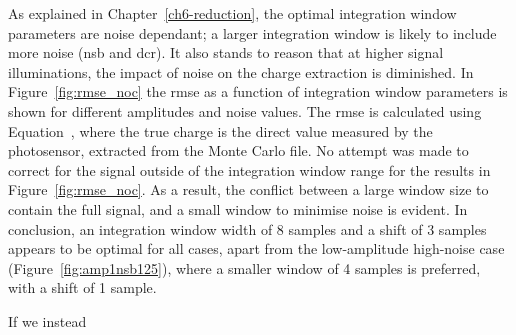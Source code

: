 As explained in Chapter~\ref{ch6-reduction}, the optimal integration window parameters are noise dependant; a larger integration window is likely to include more noise (\gls{nsb} and \gls{dcr}). It also stands to reason that at higher signal illuminations, the impact of noise on the charge extraction is diminished. In Figure~\ref{fig:rmse_noc} the \gls{rmse} as a function of integration window parameters is shown for different amplitudes and noise values. The \gls{rmse} is calculated using Equation~\label{eq:charge_res}, where the true charge is the direct value measured by the photosensor, extracted from the Monte Carlo file. No attempt was made to correct for the signal outside of the integration window range for the results in Figure~\ref{fig:rmse_noc}. As a result, the conflict between a large window size to contain the full signal, and a small window to minimise noise is evident. In conclusion, an integration window width of 8 samples and a shift of 3 samples appears to be optimal for all cases, apart from the low-amplitude high-noise case (Figure~\ref{fig:amp1nsb125}), where a smaller window of 4 samples is preferred, with a shift of 1 sample. 

If we instead





